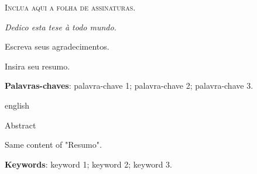 
%


\newpage
\vspace*{\fill}
\begin{center}
    \textsc{Inclua aqui a folha de assinaturas.}
\end{center}
\vspace*{\fill}
\newpage
%	
\cleardoublepage


\begin{dedicatoria}
    \vspace*{\fill}
    \centering
    \noindent
    \textit{Dedico esta tese \`{a} todo mundo.}
    \vspace*{\fill}
\end{dedicatoria}

\begin{agradecimentos}
	Escreva seus agradecimentos.
    
    
	\lipsum[1-3]
\end{agradecimentos}


\begin{resumo}
    
Insira seu resumo.

	\lipsum[1]
    
    \vspace{\onelineskip}

    \noindent\textbf{Palavras-chaves}: palavra-chave 1; palavra-chave 2; palavra-chave 3.

    \vspace{\onelineskip}
    \vspace{\onelineskip}

    \begin{otherlanguage*}{english}
    \begin{center}{\ABNTEXchapterfont\huge Abstract}\end{center}

Same content of "Resumo".       

    \vspace{\onelineskip}

    \noindent\textbf{Keywords}: keyword 1; keyword 2; keyword 3. 

    \end{otherlanguage*}
\end{resumo}



